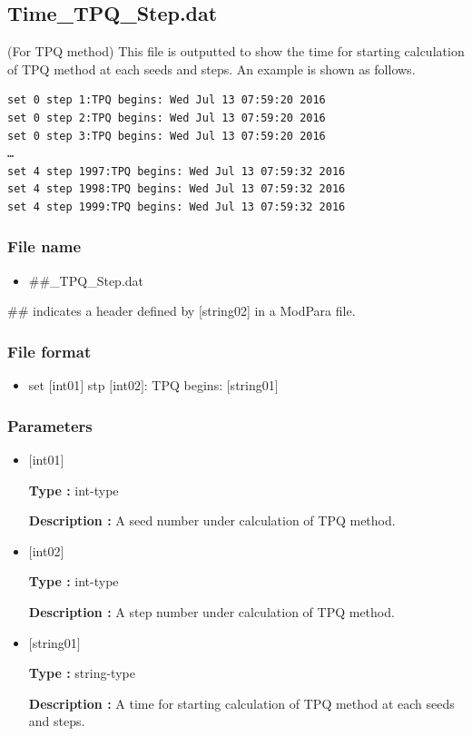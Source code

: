 \newpage
\subsection{Time\_TPQ\_Step.dat}
(For TPQ method) This file is outputted to show the time for starting calculation of TPQ method at each seeds and steps. An example is shown as follows.\\
\begin{minipage}{15cm}
\begin{screen}
\begin{verbatim}
set 0 step 1:TPQ begins: Wed Jul 13 07:59:20 2016
set 0 step 2:TPQ begins: Wed Jul 13 07:59:20 2016
set 0 step 3:TPQ begins: Wed Jul 13 07:59:20 2016
…
set 4 step 1997:TPQ begins: Wed Jul 13 07:59:32 2016
set 4 step 1998:TPQ begins: Wed Jul 13 07:59:32 2016
set 4 step 1999:TPQ begins: Wed Jul 13 07:59:32 2016
\end{verbatim}
\end{screen}
\end{minipage}

\subsubsection{File name}
 \begin{itemize}
   \item  \#\#\_TPQ\_Step.dat
  \end{itemize}
  \#\# indicates a header defined by [string02] in a ModPara file.

\subsubsection{File format}
 \begin{itemize}
   \item set $[$int01$]$ stp $[$int02$]$: TPQ begins: $[$string01$]$
  \end{itemize}
\subsubsection{Parameters}
 \begin{itemize}

  \item  $[$int01$]$
  
 {\bf Type :} int-type

{\bf Description :} A seed number under calculation of TPQ method.
 
  \item  $[$int02$]$
  
 {\bf Type :} int-type

{\bf Description :} A step number under calculation of TPQ method.

  \item  $[$string01$]$
  
 {\bf Type :} string-type

{\bf Description :} A time for starting calculation of TPQ method at each seeds and steps.

 \end{itemize}


